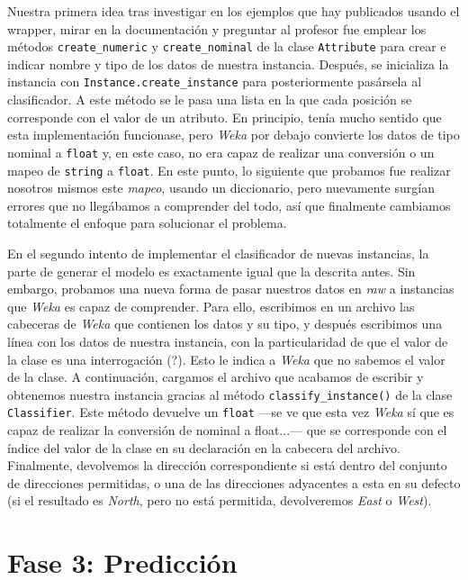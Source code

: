 \documentclass[12pt]{article}
\begin{document}
\vspace{0.5cm}

Nuestra primera idea tras investigar en los ejemplos que hay publicados usando el wrapper, mirar en la documentación y preguntar al profesor fue emplear los métodos \texttt{create\_numeric} y \texttt{create\_nominal} de la clase \texttt{Attribute} para crear e indicar nombre y tipo de los datos de nuestra instancia. Después, se inicializa la instancia con \texttt{Instance.create\_instance} para posteriormente pasársela al clasificador. A este método se le pasa una lista en la que cada posición se corresponde con el valor de un atributo. En principio, tenía mucho sentido que esta implementación funcionase, pero \emph{Weka} por debajo convierte los datos de tipo nominal a \texttt{float} y, en este caso, no era capaz de realizar una conversión o un mapeo de \texttt{string} a \texttt{float}. En este punto, lo siguiente que probamos fue realizar nosotros mismos este \emph{mapeo}, usando un diccionario, pero nuevamente surgían errores que no llegábamos a comprender del todo, así que finalmente cambiamos totalmente el enfoque para solucionar el problema.

En el segundo intento de implementar el clasificador de nuevas instancias, la parte de generar el modelo es exactamente igual que la descrita antes. Sin embargo, probamos una nueva forma de pasar nuestros datos en \emph{raw} a instancias que \emph{Weka} es capaz de comprender. Para ello, escribimos en un archivo las cabeceras de \emph{Weka} que contienen los datos y su tipo, y después escribimos una línea con los datos de nuestra instancia, con la particularidad de que el valor de la clase es una interrogación (?). Esto le indica a \emph{Weka} que no sabemos el valor de la clase. A continuación, cargamos el archivo que acabamos de escribir y obtenemos nuestra instancia gracias al método \texttt{classify\_instance()} de la clase \texttt{Classifier}. Este método devuelve un \texttt{float} ---se ve que esta vez \emph{Weka} sí que es capaz de realizar la conversión de nominal a float...--- que se corresponde con el índice del valor de la clase en su declaración en la cabecera del archivo. Finalmente, devolvemos la dirección correspondiente si está dentro del conjunto de direcciones permitidas, o una de las direcciones adyacentes a esta en su defecto (si el resultado es \emph{North}, pero no está permitida, devolveremos \emph{East} o \emph{West}).

\newpage
\section{Fase 3: Predicción}
\end{document}
